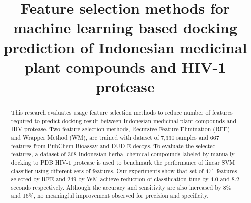 \documentclass[conference,compsoc,12pt]{IEEEtran}
\begin{document}
	
	\title{Feature selection methods for machine learning based docking prediction of Indonesian medicinal plant compounds and HIV-1 protease}
	
	
	
	\author{
	}
	
	\maketitle
	
	\begin{abstract}
		
		This research evaluates usage feature selection methods to reduce number of features required to predict docking result between Indonesian medicinal plant compounds and HIV protease. Two feature selection methods, Recursive Feature Elimination (RFE) and Wrapper Method (WM), are trained with dataset of 7,330 samples and 667 features from PubChem Bioassay and DUD-E decoys. To evaluate the selected features, a dataset of 368 Indonesian herbal chemical compounds labeled by manually docking to PDB HIV-1 protease is used to benchmark the performance of linear SVM classifier using different sets of features. Our experiments show that set of 471 features selected by RFE and 249 by WM achieve reduction of classification time by 4.0 and 8.2 seconds respectively. Although the accuracy and sensitivity are also increased by 8\% and 16\%, no meaningful improvement observed for precision and specificity.  
		
	\end{abstract}
	
\end{document}
